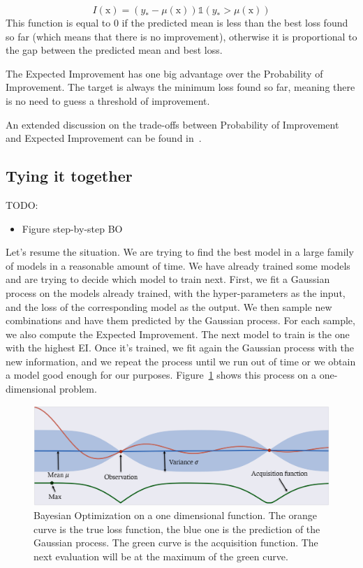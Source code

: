 \begin{equation}
	I(\mathrm{x}) = \left(y_* - \mu(\mathrm{x}) \right) \mathds{1} \left(y_* > \mu(\mathrm{x}) \right)
\end{equation}
This function is equal to $0$ if the predicted mean is less than the best loss found so far (which means that there is no improvement), otherwise it is proportional to the gap between the predicted mean and best loss. 

The Expected Improvement has one big advantage over the Probability of Improvement. The target is always the minimum loss found so far, meaning there is no need to guess a threshold of improvement. 

An extended discussion on the trade-offs between Probability of Improvement and Expected Improvement can be found in~\textcite{jones2001}.

\subsection{Tying it together}

TODO:
\begin{itemize}
    \item Figure step-by-step BO
\end{itemize}

Let's resume the situation. We are trying to find the best model in a large family of models in a reasonable amount of time. We have already trained some models and are trying to decide which model to train next. First, we fit a Gaussian process on the models already trained, with the hyper-parameters as the input, and the loss of the corresponding model as the output. We then sample new combinations and have them predicted by the Gaussian process. For each sample, we also compute the Expected Improvement. The next model to train is the one with the highest EI. Once it's trained, we fit again the Gaussian process with the new information, and we repeat the process until we run out of time or we obtain a model good enough for our purposes. Figure~\ref{fig:bo} shows this process on a one-dimensional problem.

\begin{figure}[htb]
	\centering
	\includegraphics[width=\linewidth]{img_hyperopt/bo.png}
	\caption{Bayesian Optimization on a one dimensional function. The orange curve is the true loss function, the blue one is the prediction of the Gaussian process. The green curve is the acquisition function. The next evaluation will be at the maximum of the green curve.}
	\label{fig:bo}
\end{figure}

